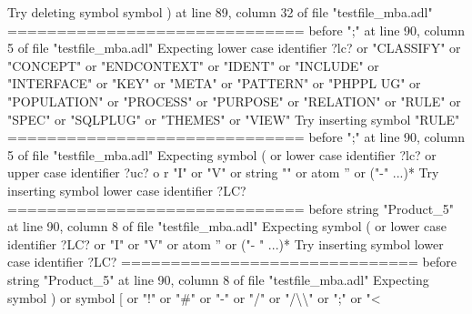{  Try deleting symbol symbol ) at line 89, column 32 of file "testfile\_mba.adl"\newline
  \newline
  ==============================\newline
  \newline
  before ";" at line 90, column 5 of file "testfile\_mba.adl"\newline
  Expecting lower case identifier ?lc? or "CLASSIFY" or "CONCEPT" or "ENDCONTEXT"\newline
  or "IDENT" or "INCLUDE" or "INTERFACE" or "KEY" or "META" or "PATTERN" or "PHPPL\newline
  UG" or "POPULATION" or "PROCESS" or "PURPOSE" or "RELATION" or "RULE" or "SPEC"\newline
  or "SQLPLUG" or "THEMES" or "VIEW"\newline
  Try inserting symbol "RULE"\newline
  \newline
  ==============================\newline
  \newline
  before ";" at line 90, column 5 of file "testfile\_mba.adl"\newline
  Expecting symbol ( or lower case identifier ?lc? or upper case identifier ?uc? o\newline
  r "I" or "V" or string "" or atom '' or ("-" ...)*\newline
  Try inserting symbol lower case identifier ?LC?\newline
  \newline
  ==============================\newline
  \newline
  before string "Product\_5" at line 90, column 8 of file "testfile\_mba.adl"\newline
  Expecting symbol ( or lower case identifier ?LC? or "I" or "V" or atom '' or ("-\newline
  " ...)*\newline
  Try inserting symbol lower case identifier ?LC?\newline
  \newline
  ==============================\newline
  \newline
  before string "Product\_5" at line 90, column 8 of file "testfile\_mba.adl"\newline
  Expecting symbol ) or symbol [ or "!" or "\#" or "-" or "/" or "/\textbackslash{}\textbackslash{}" or ";" or "<\newline
}
